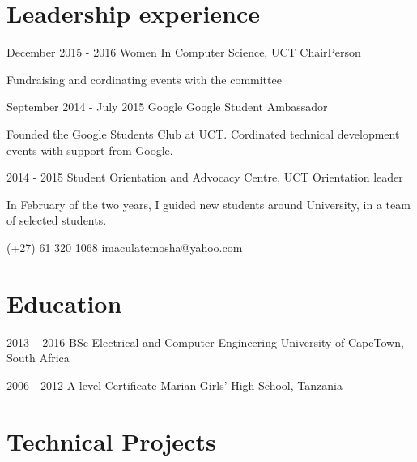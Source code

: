 \documentclass[fontsize=9pt]{tccv}
\begin{document}
\section{Leadership experience}

\begin{eventlist}
\item{December 2015 - 2016}
	{Women In Computer Science, UCT}
	{ChairPerson}
	
Fundraising and cordinating events with the committee

\item{September 2014 - July 2015}
{Google}
{Google Student Ambassador}

Founded the Google Students Club at UCT. Cordinated technical development events with support from Google.

\item{2014 - 2015}
{Student Orientation and Advocacy Centre, UCT}
{Orientation leader}

In February of the two years, I guided new students around University, in a team of selected students.

\end{eventlist}
    {(+27) 61 320 1068}
    {imaculatemosha@yahoo.com}

\section{Education}

\begin{yearlist}

\item{2013 -- 2016}
     {BSc Electrical and Computer Engineering}
     {University of CapeTown, South Africa}

\item{2006 - 2012}
     {A-level Certificate}
     {Marian Girls' High School, Tanzania}

\end{yearlist}

\section{Technical Projects}
\end{document}
